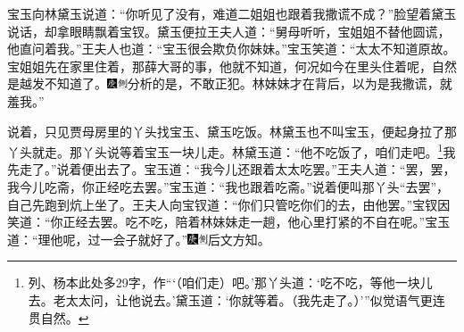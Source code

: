 宝玉向林黛玉说道：“你听见了没有，难道二姐姐也跟着我撒谎不成？”脸望着黛玉说话，却拿眼睛飘着宝钗。黛玉便拉王夫人道：“舅母听听，宝姐姐不替他圆谎，他直问着我。”王夫人也道：“宝玉很会欺负你妹妹。”宝玉笑道：“太太不知道原故。宝姐姐先在家里住着，那薛大哥的事，他就不知道，何况如今在里头住着呢，自然是越发不知道了。{\includegraphics[width=3mm]{../Images/00004}\includegraphics[width=3mm]{../Images/00011}\footnotesize \kaishu 分析的是，不敢正犯。}林妹妹才在背后，以为是我撒谎，就羞我。”

说着，只见贾母房里的丫头找宝玉、黛玉吃饭。林黛玉也不叫宝玉，便起身拉了那丫头就走。那丫头说等着宝玉一块儿走。林黛玉道：“他不吃饭了，咱们走吧。\footnote{列、杨本此处多29字，作“‘（咱们走）吧。’那丫头道：‘吃不吃，等他一块儿去。老太太问，让他说去。’黛玉道：‘你就等着。（我先走了。）’”似觉语气更连贯自然。}我先走了。”说着便出去了。宝玉道：“我今儿还跟着太太吃罢。”王夫人道：“罢，罢，我今儿吃斋，你正经吃去罢。”宝玉道：“我也跟着吃斋。”说着便叫那丫头“去罢”，自己先跑到炕上坐了。王夫人向宝钗道：“你们只管吃你们的去，由他罢。”宝钗因笑道：“你正经去罢。吃不吃，陪着林妹妹走一趟，他心里打紧的不自在呢。”宝玉道：“理他呢，过一会子就好了。”{\includegraphics[width=3mm]{../Images/00004}\includegraphics[width=3mm]{../Images/00011}\footnotesize \kaishu 后文方知。}


